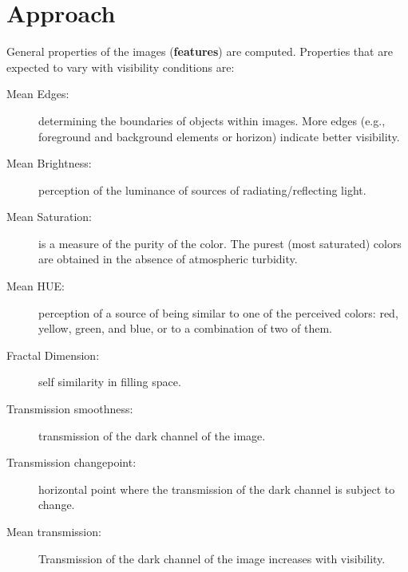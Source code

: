 \documentclass{article}
\begin{document}
\section*{Approach}
General properties of the images (\textbf{features}) are computed. 
Properties that are expected to vary with visibility conditions are:

\begin{tcolorbox}[colback=red!5!white,colframe=red!75!black,title=Image Features]
\begin{description}
\item[Mean Edges:] determining the boundaries of objects within images. 
More edges (e.g., foreground and background elements or horizon) indicate better
visibility.
\item[Mean Brightness:] perception of the luminance of sources of radiating/reflecting light.
\item[Mean Saturation:] is a measure of the purity of the color. 
The purest (most saturated) colors are obtained in the absence of atmospheric turbidity.
\item[Mean HUE:] perception of a source of being similar to one of the perceived colors: red, yellow, green, and blue, or to a combination of two of them.
\item[Fractal Dimension:] self similarity in filling space.
\item[Transmission smoothness:] transmission of the dark channel of the image.
\item[Transmission changepoint:] horizontal point where the transmission of the dark channel is subject to change.
\item[Mean transmission:] Transmission of the dark channel of the image increases with visibility.
\end{description}
\end{tcolorbox}
\end{document}
